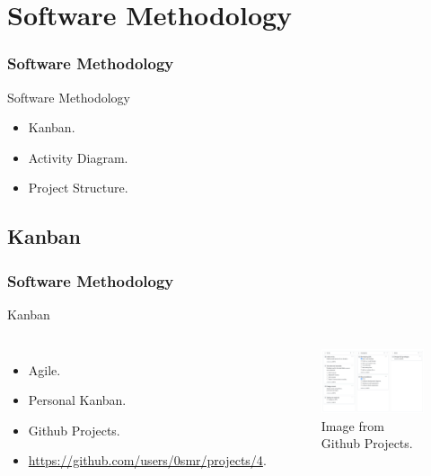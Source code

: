 \documentclass[aspectratio=169,11pt]{beamer}
\begin{document}
	\section{Software Methodology}
	\begin{frame}
	\frametitle{Software Methodology}
	\begin{block}{Software Methodology}
		\begin{itemize}
			\item Kanban.
			\item Activity Diagram.
			\item Project Structure.
		\end{itemize}
	\end{block}
	\end{frame}

	\subsection{Kanban}
	\begin{frame}
	\frametitle{Software Methodology}
	\begin{block}{Kanban}
		\begin{columns}[c]
			\column{.35\textwidth}
			\begin{itemize}
				\item Agile.
				\item Personal Kanban.
				\item Github Projects.
				\item \url{https://github.com/users/0smr/projects/4}.
			\end{itemize}
			\column{.55\textwidth}
			\begin{figure}[!h]
				\centering
				\includegraphics[width=\textwidth]{../latex/images/kanban-board.pdf}
				\caption{Image from Github Projects.}
			\end{figure}
		\end{columns}
	\end{block}
	\end{frame}
\end{document}
